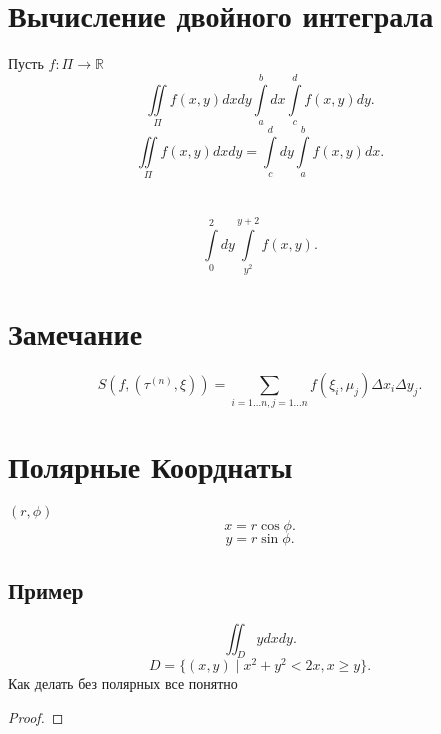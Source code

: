 \documentclass[14pt]{extarticle} \usepackage{fontspec}
\begin{document}
    \section{Вычисление двойного интеграла}
    Пусть $f: \Pi \to \mathbb{R}$
    \[
    \iint\limits_{\Pi} f(x,y) dx dy \int\limits_{a}^{b} dx \int\limits_{c}^{d} f(x,y)  dy
    .\] 
    \[
    \iint\limits_{\Pi} f(x,y) dx dy = \int\limits_{c}^{d} dy \int\limits_{a}^{b} f(x,y)   dx
    .\] 
    \section{}
    \[
        \int\limits_{0}^{2} dy \int\limits_{y^2}^{y+2} f(x,y)   
    .\] 
\section{Замечание}
\[
S(f,(\tau^{(n)},\xi)) = \sum_{i=1\dots n,j= 1 \dots n} f(\xi_{i},\mu_{j}) \varDelta x_{i} \varDelta y_{j}
.\] 
\section{Полярные Коорднаты}
$(r,\phi)$
 \[
     x = r \cos{\phi}
.\] 
\[
    y = r \sin {\phi}
.\] 
\subsection{Пример}
\[
\iint_{D} y dx dy
.\] 
\[
    D = \{(x,y) \mid x^2 + y^2 < 2x , x\ge y\}
.\] 
Как делать без полярных все понятно
\begin{proof}
    
\end{proof}
\end{document}
